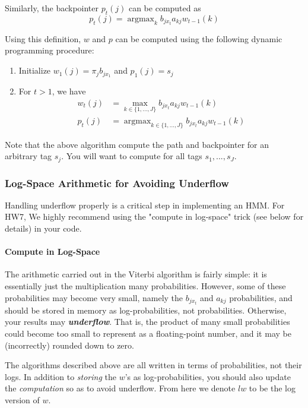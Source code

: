 \documentclass{article}
\newcommand{\argmax}{\mathop{\mathrm{argmax}}}
\begin{document}
Similarly, the backpointer $p_t(j)$ can be computed as 
$$p_t(j) = \argmax_{k} b_{jx_t} a_{kj} w_{t-1}(k) $$

Using this definition, $w$ and $p$ can be computed using the following dynamic programming procedure: 
\begin{enumerate}
    \item Initialize $w_1(j) = \pi_j b_{jx_1}$ and $p_1(j) = s_j$
    \item For $t > 1$, we have 
    \begin{align*}
        w_t(j) &= \max_{k \in \{1,...,J\}} b_{jx_t} a_{kj} w_{t-1}(k) \\ 
        p_t(j) &= \argmax_{k \in \{1,...,J\}} b_{jx_t} a_{kj} w_{t-1}(k)
    \end{align*}
\end{enumerate}
Note that the above algorithm compute the path and backpointer for an arbitrary tag $s_j$. You will want to compute for all tags $s_1, ..., s_J$.

\subsubsection{Log-Space Arithmetic for Avoiding Underflow}
\label{sec:underflow}

Handling underflow properly is a critical step in implementing an HMM. For HW7, We highly recommend using the "compute in log-space" trick (see below for details) in your code.

\paragraph{Compute in Log-Space} The arithmetic carried out in the Viterbi algorithm is fairly simple: it is essentially just the multiplication many probabilities. However, some of these probabilities may become very small, namely the $b_{jx_t}$ and $a_{kj}$ probabilities, and should be stored in memory as log-probabilities, not probabilities. Otherwise, your results may \textbf{\emph{underflow}}. That is, the product of many small probabilities could become too small to represent as a floating-point number, and it may be (incorrectly) rounded down to zero.

The algorithms described above are all written in terms of probabilities, not their logs. In addition to \emph{storing} the $w$'s as log-probabilities, you should also update the \emph{computation} so as to avoid underflow. From here we denote $lw$ to be the log version of $w$.
\end{document}
